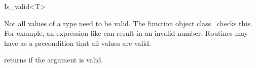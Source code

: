 \begin{ccRefFunctionObjectClass}{Is_valid<T>}

\ccDefinition

Not all values of a type need to be valid. The function object 
class \ccRefName\ checks this. \\

For example, an expression like
 can result in an invalid number. 
Routines may have as a precondition that all values are valid.
 


\ccIsModel
{}

{returns if the argument is valid.}

\end{ccRefFunctionObjectClass}